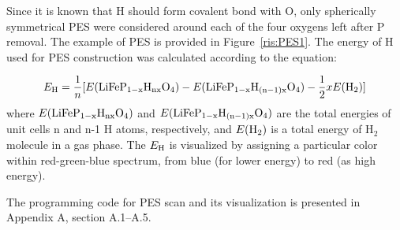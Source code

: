Since it is known that H should form covalent bond with O, only spherically symmetrical PES were considered around each of the four oxygens left after P removal. The example of PES is provided in Figure~\ref{ris:PES1}. 
The energy of H used for PES construction was calculated according to the equation:

\begin{equation}
E_{\rm H} = \frac{1}{n}[E({\rm LiFeP_{1-x}H_{nx}O_4}) - E({\rm LiFeP_{1-x}H_{(n-1)x}O_4} ) - \frac{1}{2}xE({\rm H_2})]
\label{eq:form}
\end{equation}
where $E({\rm LiFeP_{1-x}H_{nx}O_4})$ and $E({\rm LiFeP_{1-x}H_{(n-1)x}O_4} )$ are the total energies of unit cells n and n-1 H atoms, respectively, and $E({\rm H_2})$ is a total energy of H$_2$ molecule in a gas phase. 
The $E_{\rm H}$ is  visualized by assigning a particular color within red-green-blue spectrum, from blue (for lower energy) to red (as high energy). 

The programming code for PES scan and its visualization is presented in Appendix A, section A.1--A.5.

